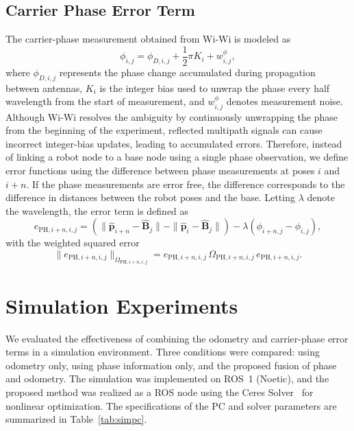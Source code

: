 \documentclass[conference]{IEEEtran}
\begin{document}
\subsection{Carrier Phase Error Term}
The carrier-phase measurement obtained from Wi-Wi is modeled as~\cite{Peng2017}
\begin{equation}
     \phi_{i,j} = \phi_{D,i,j} + \frac{1}{2}\pi K_i + w^{\phi}_{i,j},
\end{equation}
where $\phi_{D,i,j}$ represents the phase change accumulated during propagation between antennas, $K_i$ is the integer bias used to unwrap the phase every half wavelength from the start of measurement, and $w^{\phi}_{i,j}$ denotes measurement noise.
Although Wi-Wi resolves the ambiguity by continuously unwrapping the phase from the beginning of the experiment, reflected multipath signals can cause incorrect integer-bias updates, leading to accumulated errors.
Therefore, instead of linking a robot node to a base node using a single phase observation, we define error functions using the difference between phase measurements at poses $i$ and $i+n$.
If the phase measurements are error free, the difference corresponds to the difference in distances between the robot poses and the base.
Letting $\lambda$ denote the wavelength, the error term is defined as
\begin{equation}
    e_{\mathrm{PH},i+n,i,j} = \left(\|\mathbf{\hat{p}}_{i+n} - \mathbf{\hat{B}}_j\| - \|\mathbf{\hat{p}}_{i} - \mathbf{\hat{B}}_j\|\right) - \lambda (\phi_{i+n,j} - \phi_{i,j}),
\end{equation}
with the weighted squared error
\begin{equation}
    \|e_{\mathrm{PH},i+n,i,j}\|_{\Omega_{\mathrm{PH},i+n,i,j}} = e_{\mathrm{PH},i+n,i,j} \, \Omega_{\mathrm{PH},i+n,i,j} \, e_{\mathrm{PH},i+n,i,j}.
\end{equation}

\section{Simulation Experiments}
We evaluated the effectiveness of combining the odometry and carrier-phase error terms in a simulation environment.
Three conditions were compared: using odometry only, using phase information only, and the proposed fusion of phase and odometry.
The simulation was implemented on ROS~1 (Noetic), and the proposed method was realized as a ROS node using the Ceres Solver~\cite{ceres-solver} for nonlinear optimization.
The specifications of the PC and solver parameters are summarized in Table~\ref{tab:simpc}.
\end{document}
